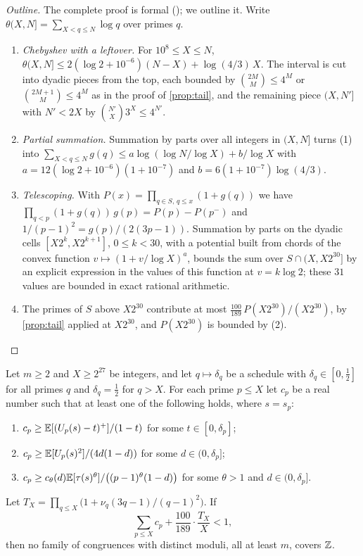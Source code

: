 \begin{proof}[Outline]
The complete proof is formal (); we outline it. Write $\theta(X,N]=\sum_{X<q\le N}\log q$
over primes $q$.
\begin{enumerate}[label=(\arabic*)]
\item \emph{Chebyshev with a leftover.} For $10^8\le X\le N$,
  $\theta(X,N]\le2(\log2+10^{-6})(N-X)+\log(4/3)\,X$. The interval is cut into dyadic pieces from the top, each bounded
  by $\binom{2M}{M}\le4^M$ or $\binom{2M+1}{M}\le4^M$ as in the proof of \cref{prop:tail}, and the remaining piece
  $(X,N']$ with $N'<2X$ by $\binom{N'}{X}3^X\le4^{N'}$.
\item \emph{Partial summation.} Summation by parts over all integers in $(X,N]$ turns (1) into
  $\sum_{X<q\le N}g(q)\le a\log(\log N/\log X)+b/\log X$ with $a=12(\log2+10^{-6})(1+10^{-7})$ and
  $b=6(1+10^{-7})\log(4/3)$.
\item \emph{Telescoping.} With $P(x)=\prod_{q\in S,\,q\le x}(1+g(q))$ we have
  $\prod_{q<p}(1+g(q))\,g(p)=P(p)-P(p^-)$ and $1/(p-1)^2=g(p)/(2(3p-1))$. Summation by parts on the dyadic cells
  $[X2^k,X2^{k+1}]$, $0\le k<30$, with a potential built from chords of the convex function
  $v\mapsto(1+v/\log X)^a$, bounds the sum over $S\cap(X,X2^{30}]$ by an explicit expression in the values of this
  function at $v=k\log2$; these $31$ values are bounded in exact rational arithmetic.
\item The primes of $S$ above $X2^{30}$ contribute at most $\frac{100}{189}\,P(X2^{30})/(X2^{30})$, by
  \cref{prop:tail} applied at $X2^{30}$, and $P(X2^{30})$ is bounded by (2).\qedhere
\end{enumerate}
\end{proof}

\begin{theorem}\label{thm:criterion}
Let $m\ge2$ and $X\ge2^{27}$ be integers, and let $q\mapsto\delta_q$ be a schedule with $\delta_q\in[0,\frac12]$ for
all primes $q$ and $\delta_q=\frac12$ for $q>X$. For each prime $p\le X$ let $c_p$ be a real number such that at
least one of the following holds, where $s=s_p$:
\begin{enumerate}[label=(\roman*)]
\item $c_p\ge\mathbb{E}[(U_p(s)-t)^+]/(1-t)$ for some $t\in[0,\delta_p]$;
\item $c_p\ge\mathbb{E}[U_p(s)^2]/(4d(1-d))$ for some $d\in(0,\delta_p]$;
\item $c_p\ge c_\theta(d)\mathbb{E}[\tau(s)^\theta]/\bigl((p-1)^\theta(1-d)\bigr)$ for some $\theta>1$ and $d\in(0,\delta_p]$.
\end{enumerate}
Let $T_X=\prod_{q\le X}\bigl(1+\nu_q(3q-1)/(q-1)^2\bigr)$. If
\begin{equation}\label{eq:criterion}
  \sum_{p\le X}c_p+\frac{100}{189}\cdot\frac{T_X}{X}<1,
\end{equation}
then no family of congruences with distinct moduli, all at least $m$, covers $\mathbb{Z}$.
\end{theorem}

